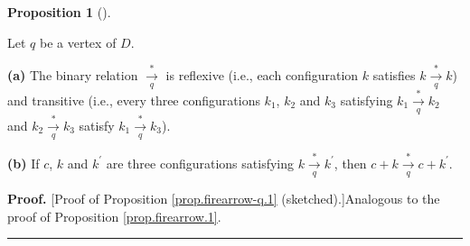 \documentclass[numbers=enddot,12pt,final,onecolumn,notitlepage]{scrartcl}%
\theoremstyle{definition}
\newtheorem{prop}[theo]{Proposition}
\newenvironment{proposition}[1][]
{\begin{prop}[#1]\begin{leftbar}}
{\end{leftbar}\end{prop}}
\newenvironment{proof}[1][Proof]{\noindent\textbf{#1.} }{\ \rule{0.5em}{0.5em}}
\begin{document}
\begin{proposition}
\label{prop.firearrow-q.1}Let $q$ be a vertex of $D$.

\textbf{(a)} The binary relation $\underset{q}{\overset{\ast}{\rightarrow}}$
is reflexive (i.e., each configuration $k$ satisfies
$k\underset{q}{\overset{\ast}{\rightarrow}}k$) and transitive (i.e., every
three configurations $k_{1}$, $k_{2}$ and $k_{3}$ satisfying $k_{1}%
\underset{q}{\overset{\ast}{\rightarrow}}k_{2}$ and $k_{2}%
\underset{q}{\overset{\ast}{\rightarrow}}k_{3}$ satisfy $k_{1}%
\underset{q}{\overset{\ast}{\rightarrow}}k_{3}$).

\textbf{(b)} If $c$, $k$ and $k^{\prime}$ are three configurations satisfying
$k\underset{q}{\overset{\ast}{\rightarrow}}k^{\prime}$, then
$c+k\underset{q}{\overset{\ast}{\rightarrow}}c+k^{\prime}$.
\end{proposition}

\begin{proof}
[Proof of Proposition \ref{prop.firearrow-q.1} (sketched).]Analogous to the
proof of Proposition \ref{prop.firearrow.1}.
\end{proof}
\end{document}
